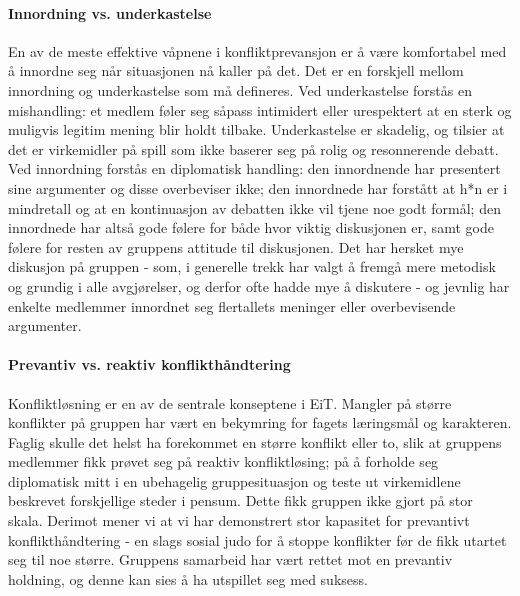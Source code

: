 \paragraph{Innordning vs. underkastelse}
En av de meste effektive våpnene i konfliktprevansjon er å være komfortabel med å innordne seg når situasjonen nå kaller på det. Det er en forskjell mellom innordning og underkastelse som må defineres. Ved underkastelse forstås en mishandling: et medlem føler seg såpass intimidert eller urespektert at en sterk og muligvis legitim mening blir holdt tilbake. Underkastelse er skadelig, og tilsier at det er virkemidler på spill som ikke baserer seg på rolig og resonnerende debatt. Ved innordning forstås en diplomatisk handling: den innordnende har presentert sine argumenter og disse overbeviser ikke; den innordnede har forstått at h*n er i mindretall og at en kontinuasjon av debatten ikke vil tjene noe godt formål; den innordnede har altså gode følere for både hvor viktig diskusjonen er, samt gode følere for resten av gruppens attitude til diskusjonen. Det har hersket mye diskusjon på gruppen - som, i generelle trekk har valgt å fremgå mere metodisk og grundig i alle avgjørelser, og derfor ofte hadde mye å diskutere - og jevnlig har enkelte medlemmer innordnet seg flertallets meninger eller overbevisende argumenter. 

\paragraph{Prevantiv vs. reaktiv konflikthåndtering}
Konfliktløsning er en av de sentrale konseptene i EiT. Mangler på større konflikter på gruppen har vært en bekymring for fagets læringsmål og karakteren. Faglig skulle det helst ha forekommet en større konflikt eller to, slik at gruppens medlemmer fikk prøvet seg på reaktiv konfliktløsing; på å forholde seg diplomatisk mitt i en ubehagelig gruppesituasjon og teste ut virkemidlene beskrevet forskjellige steder i pensum. 
Dette fikk gruppen ikke gjort på stor skala. Derimot mener vi at vi har demonstrert stor kapasitet for prevantivt konflikthåndtering - en slags sosial judo for å stoppe konflikter før de fikk utartet seg til noe større. Gruppens samarbeid har vært rettet mot en prevantiv holdning, og denne kan sies å ha utspillet seg med suksess. 
